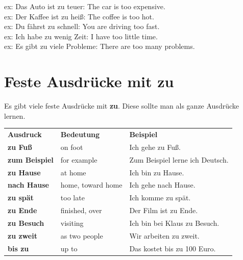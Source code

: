 \documentclass[a4paper,12pt]{article}
\begin{document}
        ex: Das Auto ist zu teuer: The car is too expensive.\\
        ex: Der Kaffee ist zu heiß: The coffee is too hot.\\
        ex: Du fährst zu schnell: You are driving too fast.\\
        ex: Ich habe zu wenig Zeit: I have too little time.\\
        ex: Es gibt zu viele Probleme: There are too many problems.
    
    
    \section{Feste Ausdrücke mit zu}
        
        Es gibt viele feste Ausdrücke mit \textbf{zu}. Diese sollte man als ganze Ausdrücke lernen.
        
        \begin{tabular}{>{\bfseries}p{4cm}p{5cm}p{5cm}}
            \rowcolor{HeaderBlueDark}
            \color{white}\textbf{Ausdruck} & \color{white}\textbf{Bedeutung} & \color{white}\textbf{Beispiel}  \\
            zu Fuß                         & on foot                         & Ich gehe zu Fuß.                \\
            zum Beispiel                   & for example                     & Zum Beispiel lerne ich Deutsch. \\
            zu Hause                       & at home                         & Ich bin zu Hause.               \\
            nach Hause                     & home, toward home               & Ich gehe nach Hause.            \\
            zu spät                        & too late                        & Ich komme zu spät.              \\
            zu Ende                        & finished, over                  & Der Film ist zu Ende.           \\
            zu Besuch                      & visiting                        & Ich bin bei Klaus zu Besuch.    \\
            zu zweit                       & as two people                   & Wir arbeiten zu zweit.          \\
            bis zu                         & up to                           & Das kostet bis zu 100 Euro.     \\
        \end{tabular}
    
\end{document}
